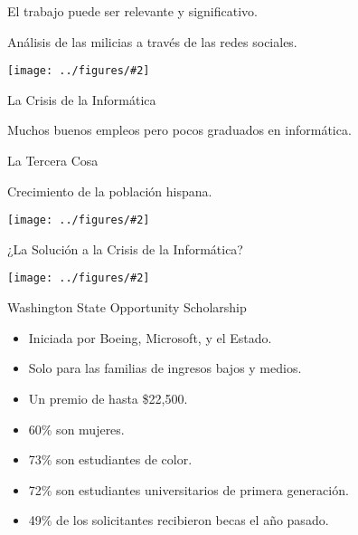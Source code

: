 \documentclass{beamer}
\newcommand{\fig}[2]{
  \texttt{[image: ../figures/\#2]}
}
\begin{document}
\begin{centering}
\begin{frame}[fragile]{El trabajo puede ser relevante y significativo.}
  
  {Análisis de las milicias a través de las redes sociales.}
  
  
  \vfill
  
  \fig{1.0}{saiph}
  
  
  
\end{frame}

\begin{frame}[fragile]{La Crisis de la Informática}
  
  {Muchos buenos empleos pero pocos graduados en informática.}
  
  \vfill
  
  
  
\end{frame}

\begin{frame}[fragile]{La Tercera Cosa}
  \pause
  
  Crecimiento de la población hispana.
  \vfill
  \fig{1.0}{hispanicpopgrowth}
\end{frame}


\begin{frame}[fragile]{¿La Solución a la Crisis de la Informática?}
  \pause
  

  
  \fig{1.0}{whitesdominate}
\end{frame}


\begin{frame}[fragile]{Washington State Opportunity Scholarship}


  \begin{itemize}
  \item Iniciada por Boeing, Microsoft, y el Estado.
  \item Solo para las familias de ingresos bajos y medios.
  \item Un premio de hasta \$22,500.
  \item 60\% son mujeres.
  \item 73\% son estudiantes de color.
  \item 72\% son estudiantes universitarios de primera generación.
  \item 49\% de los solicitantes recibieron becas el año pasado.
  \end{itemize}


\end{frame}
\end{centering}
\end{document}
